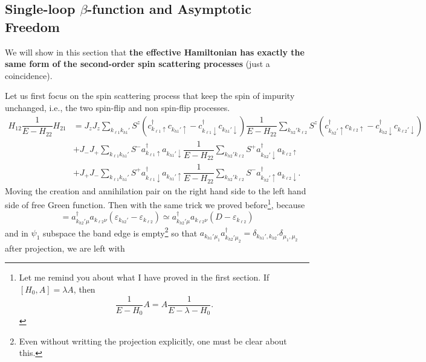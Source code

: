 \documentclass[aps,prx,superscriptaddress,onecolumn,preprintnumbers,nofootinbib,longbibliography]{revtex4-1}
\begin{document}
	\subsection{Single-loop $\beta$-function and Asymptotic Freedom}
		We will show in this section that \textbf{the effective Hamiltonian has exactly the same form of the second-order spin scattering processes} (just a coincidence).\par
		Let us first focus on the spin scattering process that keep the spin of impurity unchanged, i.e., the two spin-flip and non spin-flip processes.
		\begin{align}
		 	H_{12}\dfrac{1}{E-H_{22}}H_{21}&=J_zJ_z\sum_{k_{\ell1} k_{h1}'}S^z(c_{k_{\ell1}\uparrow}^\dagger c_{k_{h1}'\uparrow}-c_{k_{\ell1}\downarrow}^\dagger c_{k_{h1}'\downarrow})\dfrac{1}{E-H_{22}}\sum_{k_{h2}'k_{\ell2} }S^z(c_{k_{h2}'\uparrow}^\dagger c_{k_{\ell2}\uparrow}-c_{k_{h2}\downarrow}^\dagger c_{k_{\ell2}'\downarrow})\nonumber\\
		 	&+J_-J_+\sum_{k_{\ell1}k_{h1}'} S^-a_{k_{\ell1}\uparrow}^\dagger a_{k_{h1}'\downarrow}\dfrac{1}{E-H_{22}}\sum_{k_{h2}'k_{\ell2}}S^+ a_{k_{h2}'\downarrow}^\dagger a_{k_{\ell2}\uparrow}\nonumber\\
		 	&+J_+J_-\sum_{k_{\ell1}k_{h1}'} S^+a_{k_{\ell1}\downarrow}^\dagger a_{k_{h1}'\uparrow}\dfrac{1}{E-H_{22}}\sum_{k_{h2}'k_{\ell2}}S^- a_{k_{h2}'\uparrow}^\dagger a_{k_{\ell2}\downarrow}.\label{3.1.2}
		\end{align}
		Moving the creation and annihilation pair on the right hand side to the left hand side of free Green function. Then with the same trick we proved before\footnote{Let me remind you about what I have proved in the first section. If $[H_0,A]=\lambda A$, then \begin{equation*}
			\dfrac{1}{E-H_0}A=A\dfrac{1}{E-\lambda-H_0}.
		\end{equation*}}, because
		\begin{equation*}
			[H_0,a_{k_{h2}'\mu}^\dagger a_{k_{\ell2}\nu}]=a_{k_{h2}'\mu}^\dagger a_{k_{\ell2}\nu}(\varepsilon_{k_{h2}'}-\varepsilon_{k_{\ell2}})\simeq a_{k_{h2}'\mu}^\dagger a_{k_{\ell2}\nu}(D-\varepsilon_{k_{\ell2}})
		\end{equation*}
		and in $\psi_1$ subspace the band edge is empty\footnote{Even without writting the projection explicitly, one must be clear about this.} so that $a_{k_{h1}'\mu_1}a_{k_{h2}'\mu_2}^\dagger=\delta_{k_{h1}',k_{h2}'}\delta_{\mu_1,\mu_2}$ after projection, we are left with
\end{document}
